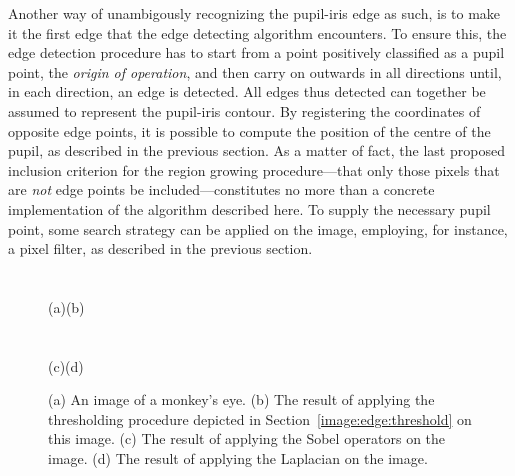 Another way of unambigously recognizing the pupil-iris edge as such,
is to make it the first edge that the edge detecting algorithm
encounters.  To ensure this, the edge detection procedure has to start
from a point positively classified as a pupil point, the {\em origin
  of operation\/}, and then carry on outwards in all directions until,
in each direction, an edge is detected.  All edges thus detected can
together be assumed to represent the pupil-iris contour.  By
registering the coordinates of opposite edge points, it is possible to
compute the position of the centre of the pupil, as described in the
previous section.  As a matter of fact, the last proposed inclusion
criterion for the region growing procedure---that only those pixels
that are {\em not\/} edge points be included---constitutes no more
than a concrete implementation of the algorithm described here.  To
supply the necessary pupil point, some search strategy can be applied
on the image, employing, for instance, a pixel filter, as described in
the previous section.

\begin{figure}[tb]
  \textwidth
  \paragraph{}
  \\
  \hspace*{0.28\textwidth}(a)\hspace*{0.38\textwidth}(b)
  \paragraph{}
  \\
  \hspace*{0.28\textwidth}(c)\hspace*{0.38\textwidth}(d)
  \caption{\label{fig:compare}(a) An image of a monkey's eye.  (b) The
    result of applying the thresholding procedure depicted in
    Section~\protect\ref{image:edge:threshold} on this image.  (c) The
    result of applying the Sobel operators on the image.  (d) The
    result of applying the Laplacian on the image.}
\end{figure}

